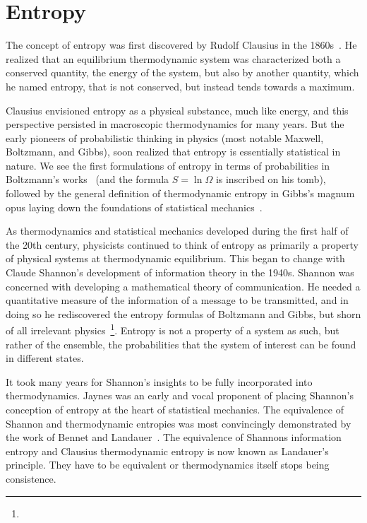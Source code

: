 \documentclass[Lectures.tex]{subfiles}
\begin{document}

\section{Entropy}


The concept of entropy was first discovered by Rudolf Clausius in the 1860s~\cite{???,???}. He realized that an equilibrium  thermodynamic system was characterized both a conserved quantity, the energy of the system, but also by another quantity, which he named entropy, that is not conserved, but instead tends towards a maximum. 

Clausius envisioned entropy as a physical substance, much like energy, and this perspective persisted in macroscopic thermodynamics for many years. But the early pioneers of probabilistic thinking in physics (most notable Maxwell, Boltzmann, and Gibbs), soon realized that entropy is essentially statistical in nature.  We see the first formulations of entropy in terms of probabilities in Boltzmann's works~\cite{???,???} (and the formula $S=\ln \Omega$ is inscribed on his tomb), followed by the general definition of thermodynamic entropy in Gibbs's magnum opus laying down the foundations of statistical mechanics~\cite{???}. 

As thermodynamics and statistical mechanics developed during the first half of the 20th century, physicists continued to think of entropy as primarily a property of physical systems at thermodynamic equilibrium. This began to change with  Claude Shannon's development of information theory in the 1940s. Shannon was concerned with developing a mathematical theory of communication. He needed a quantitative measure of the information of a message to be transmitted, and in doing so he rediscovered the entropy formulas of Boltzmann and Gibbs, but shorn of all irrelevant physics~\footnote{}. Entropy is not a property of a system as such, but rather of the ensemble, the probabilities  that the system of interest can be found in different states.

It took many years for Shannon's insights to be fully incorporated into thermodynamics. Jaynes\cite{???,???} was an early and vocal proponent of placing Shannon's conception of entropy at the heart of statistical mechanics. The equivalence of Shannon and thermodynamic entropies was most convincingly demonstrated by the work of Bennet and Landauer~\cite{???,???}. The equivalence of Shannons information entropy and Clausius thermodynamic entropy is now known as Landauer's principle. They have to be equivalent or thermodynamics itself stops being consistence. 
\end{document}
